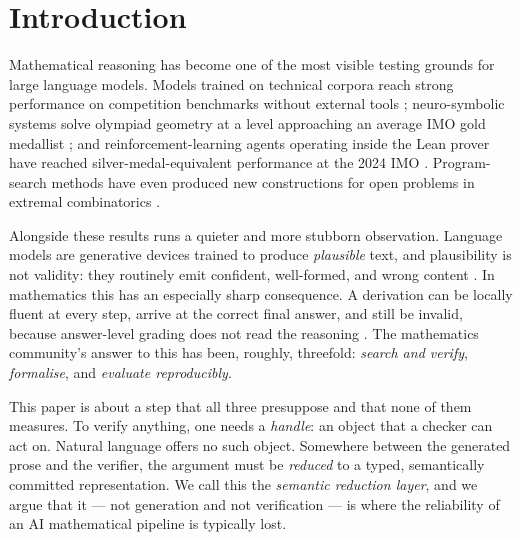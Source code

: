 \documentclass[11pt,a4paper]{article}
\theoremstyle{plain}
\theoremstyle{remark}
\begin{document}
\bigskip

\section{Introduction}
\label{sec:intro}

Mathematical reasoning has become one of the most visible testing grounds for
large language models.  Models trained on technical corpora reach strong
performance on competition benchmarks without external tools
\cite{lewkowycz2022minerva,hendrycks2021math,cobbe2021gsm8k}; neuro-symbolic
systems solve olympiad geometry at a level approaching an average IMO gold
medallist \cite{trinh2024alphageometry}; and reinforcement-learning agents
operating inside the \textsf{Lean} prover have reached silver-medal-equivalent
performance at the 2024 IMO \cite{hubert2025alphaproof}.  Program-search
methods have even produced new constructions for open problems in extremal
combinatorics \cite{romera2024funsearch}.

Alongside these results runs a quieter and more stubborn observation.  Language
models are generative devices trained to produce \emph{plausible} text, and
plausibility is not validity: they routinely emit confident, well-formed, and
wrong content \cite{ji2023hallucination}.  In mathematics this has an
especially sharp consequence.  A derivation can be locally fluent at every
step, arrive at the correct final answer, and still be invalid, because
answer-level grading does not read the reasoning
\cite{uesato2022process,lightman2023letsverify}.  The mathematics community's
answer to this has been, roughly, threefold: \emph{search and verify},
\emph{formalise}, and \emph{evaluate reproducibly}.

This paper is about a step that all three presuppose and that none of them
measures.  To verify anything, one needs a \emph{handle}: an object that a
checker can act on.  Natural language offers no such object.  Somewhere between
the generated prose and the verifier, the argument must be \emph{reduced} to a
typed, semantically committed representation.  We call this the
\emph{semantic reduction layer}, and we argue that it --- not generation and
not verification --- is where the reliability of an AI mathematical pipeline is
typically lost.
\end{document}
